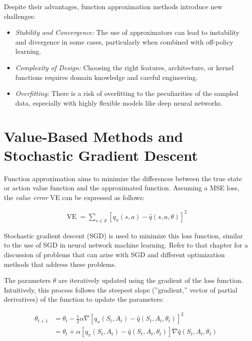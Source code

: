 Despite their advantages, function approximation methods introduce new challenges:
\begin{itemize}
\item \emph{Stability and Convergence:} The use of approximators can lead to instability and divergence in some cases, particularly when combined with off-policy learning.
\item \emph{Complexity of Design:} Choosing the right features, architecture, or kernel functions requires domain knowledge and careful engineering.
\item \emph{Overfitting:} There is a risk of overfitting to the peculiarities of the sampled data, especially with highly flexible models like deep neural networks.
\end{itemize}

\section{Value-Based Methods and Stochastic Gradient Descent}

Function approximation aims to minimize the differences between the true state or action value function and the approximated function. Assuming a MSE loss, the \emph{value error} VE can be expressed as follows:

\begin{align*}
\operatorname{VE} = \sum_{s \in \mathcal{S}} \left[ q_\pi(s, a) - \hat{q}(s, a, \theta) \right]^2
\end{align*}

Stochastic gradient descent (SGD) is used to minimize this loss function, similar to the use of SGD in neural network machine learning. Refer to that chapter for a discussion of problems that can arise with SGD and different optimization methods that address these problems. 

The parameters $\theta$ are iteratively updated using the gradient of the loss function. Intuitively, this process follows the steepest slope (''gradient,'' vector of partial derivatives) of the function to update the parameters:

\begin{align*}
\theta_{t+1} &= \theta_t - \frac{1}{2} \alpha \nabla \left[ q_\pi(S_t, A_t) - \hat{q}(S_t, A_t,  \theta_t)\right]^2 \\
 &= \theta_t + \alpha \left[ q_\pi(S_t, A_t) - \hat{q}(S_t, A_t, \theta_t)\right] \nabla \hat{q}(S_t, A_t, \theta_t)
\end{align*}

